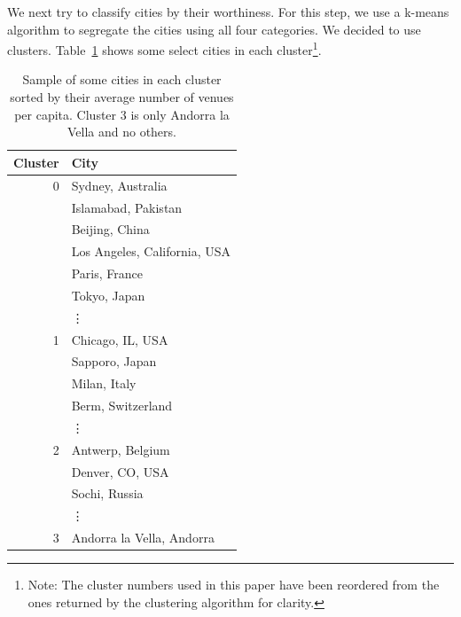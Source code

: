 \documentclass[
 reprint,
 amsmath,amssymb,
 aps,
prb,
floatfix
]{revtex4-2}
\begin{document}
    We next try to classify cities by their worthiness. For this step, we use a k-means algorithm to segregate the cities using all four categories. We decided to use clusters. Table~\ref{cluster_table} shows some select cities in each cluster\footnote{Note: The cluster numbers used in this paper have been reordered from the ones returned by the clustering algorithm for clarity.}.
    \begin{table}
        \centering
        \begin{tabular}{r|l}
            Cluster & City \\
            \hline\hline
            0 & Sydney, Australia \\
              & Islamabad, Pakistan \\
              & Beijing, China \\
              & Los Angeles, California, USA \\
              & Paris, France \\
              & Tokyo, Japan \\
              & \vdots \\
            \hline
            1 & Chicago, IL, USA \\
              & Sapporo, Japan \\
              & Milan, Italy \\
              & Berm, Switzerland \\
              & \vdots \\
            \hline
            2 & Antwerp, Belgium \\
              & Denver, CO, USA \\
              & Sochi, Russia \\
              & \vdots \\
            \hline
            3 & Andorra la Vella, Andorra
        \end{tabular}
        \caption{Sample of some cities in each cluster sorted by their average number of venues per capita. Cluster 3 is only Andorra la Vella and no others.}
        \label{cluster_table}
    \end{table}
\end{document}
